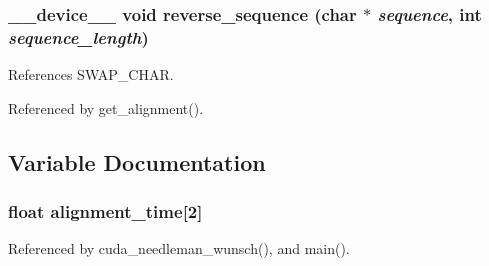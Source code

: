 \subsubsection[{reverse\_\-sequence}]{\setlength{\rightskip}{0pt plus 5cm}\_\-\_\-device\_\-\_\- void reverse\_\-sequence (char $\ast$ {\em sequence}, \/  int {\em sequence\_\-length})}\label{cuda-functions_8cu_3da22060780f4eba2554d4c92a2ad9ec}




References SWAP\_\-CHAR.

Referenced by get\_\-alignment().

\subsection{Variable Documentation}
\subsubsection[{alignment\_\-time}]{\setlength{\rightskip}{0pt plus 5cm}float {\bf alignment\_\-time}[2]}\label{cuda-functions_8cu_3d68a18b54886db326f17f526cc30d29}




Referenced by cuda\_\-needleman\_\-wunsch(), and main().